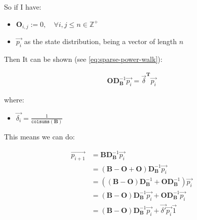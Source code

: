 \documentclass[11pt]{article}
\begin{document}
So if I have:

\begin{itemize}
\item \(\mathbf{O}_{i, j} := 0, \quad \forall i,j\leq n \in \mathbb{Z}^+\)

\item \(\vec{p_i}\) as the state distribution, being a vector of length \(n\)
\end{itemize}

Then It can be shown (see \eqref{eq:sparse-power-walk}):

$$\begin{aligned}
    \mathbf{O} \mathbf{D}_{\mathbf{B}}^{-1} \vec{p_i} = \vec{\delta} ^{\mathbf{T}}\vec{p_i} \label{eq:pw-delta-simp}\end{aligned}$$

where:

\begin{itemize}
\item \(\vec{\delta_i} = \frac{1}{\mathtt{colsums} \left( \mathbf{B} \right)}\)
\end{itemize}

This means we can do:

$$\begin{aligned}
     \vec{p_{i +  1}} &=  \mathbf{B} \mathbf{D}_{\mathbf{B}}^{- 1} \vec{p_{i}}  \\
     &= \left( \mathbf{B} -  \mathbf{O} +  \mathbf{O} \right) \mathbf{D}_{\mathbf{B}}^{- 1}\vec{p_i} \\
     &= \left( \left( \mathbf{B} -  \mathbf{O} \right) \mathbf{D}_{\mathbf{B}}^{- 1} +  \mathbf{O}\mathbf{D}_{\mathbf{B}}^{- 1} \right) \vec{p_i} \\
     &= \left( \mathbf{B}-  \mathbf{O}\right) \mathbf{D}_{\mathbf{B}}^{- 1} \vec{p_i} +  \mathbf{O} \mathbf{D}_{\mathbf{B}}^{- 1} \vec{p_i}  \\
     &= \left( \mathbf{B}- \mathbf{O} \right)\mathbf{D}_{\mathbf{B}}^{- 1} \vec{p_i} +  \vec{\delta'}\vec{p_i} \vec{1}
 \end{aligned}$$
\end{document}
